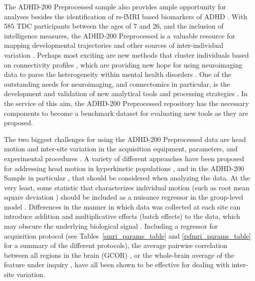 \documentclass[preprint,12pt,3p]{elsarticle}
\begin{document}
\par
The ADHD-200 Preprocessed sample also provides ample opportunity for analyses besides the identification of rs-fMRI based biomarkers of ADHD \cite{craddock2015}. With 585 TDC participants between the ages of 7 and 26, and the inclusion of intelligence measures, the ADHD-200 Preprocessed is a valuable resource for mapping developmental trajectories \cite{dosenbach2010, zuo2010, dimartino2014} and other sources of inter-individual variation \cite{kelly2012}. Perhaps most exciting are new methods that cluster individuals based on connectivity profiles \cite{miranda2014connectotyping, finn2015fingerprinting}, which are providing new hope for using neuroimaging data to parse the heterogeneity within mental health disorders \cite{castellanos2013}. One of the outstanding needs for neuroimaging, and connectomics in particular, is the development and validation of new analytical tools and processing strategies \cite{craddock2013,varoquaux2013,craddock2015}. In the service of this aim, the ADHD-200 Preprocessed repository has the necessary components to become a benchmark dataset for evaluating new tools as they are proposed.
\par
The two biggest challenges for using the ADHD-200 Preprocessed data are head motion \cite{power2012, vandijk2012, sattertwhaite2012, fair2012adhd200, yan2013motion, yan2013small} and inter-site variation in the acquisition equipment, parameters, and experimental procedures \cite{Olivetti2012,yan2013std}. A variety of different approaches have been proposed for addressing head motion in hyperkinetic populations \cite{power2012, sattertwhaite2013}, and in the ADHD-200 Sample in particular \cite{fair2012adhd200}, that should be considered when analyzing the data. At the very least, some statistic that characterizes individual motion (such as root mean square deviation \cite{JenkinsonTR99}) should be included as a nuisance regressor in the group-level model \cite{sattertwhaite2012, yan2013motion}. Differences in the manner in which data was collected at each site can introduce addition and multiplicative effects (batch effects) to the data, which may obscure the underlying biological signal \cite{Olivetti2012,yan2013std}. Including a regressor for acquisition protocol (see Tables~\ref{smri_params_table} and \ref{rsfmri_params_table} for a summary of the different protocols), the average pairwise correlation between all regions in the brain (GCOR) \cite{saad2013gcor}, or the whole-brain average of the feature under inquiry \cite{yan2013std}, have all been shown to be effective for dealing with inter-site variation. 
\end{document}
